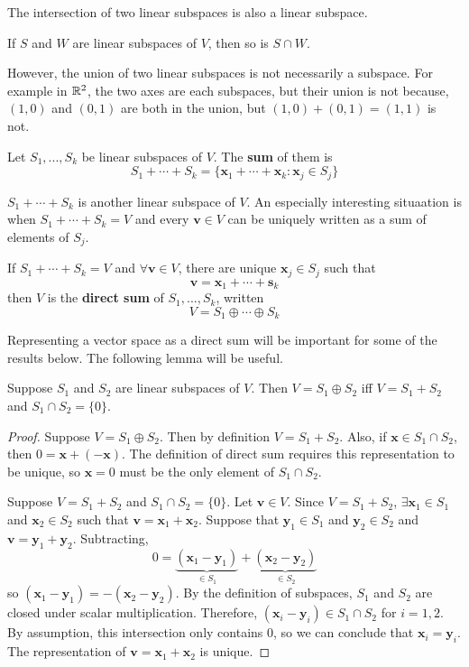 The intersection of two linear subspaces is also a linear subspace.
\begin{example}
  If $S$ and $W$ are linear subspaces of $V$, then so is $S \cap W$.
\end{example}
However, the union of two linear subspaces is not necessarily a
subspace. For example in $\mathbb{R}^2$, the two axes are each subspaces, but
their union is not because, $(1,0)$ and $(0,1)$ are both in the union,
but $(1,0) + (0,1) = (1,1)$ is not. 
\begin{definition}
  Let $S_1, ..., S_k$ be linear subspaces of $V$. The \textbf{sum} of
  them is
  \[ S_1 + \cdots + S_k = \{ \mathbf{x}_1 + \cdots + \mathbf{x}_k :
  \mathbf{x}_j \in S_j \} \]
\end{definition}
$S_1 + \cdots + S_k$ is another linear subspace of $V$. An especially
interesting situaation is when $S_1 + \cdots + S_k = V$ and every
$\mathbf{v} \in V$ can be uniquely written as a sum of elements of
$S_j$. 
\begin{definition}
  If $S_1 + \cdots + S_k = V$ and $\forall \mathbf{v} \in V$, there
  are unique $\mathbf{x}_j \in S_j$ such that 
  \[ \mathbf{v} = \mathbf{x}_1 + \cdots  + \mathbf{s}_k \]
  then $V$ is the \textbf{direct sum} of $S_1, ..., S_k$, written 
  \[ V = S_1 \oplus \cdots \oplus S_k \]
\end{definition}
Representing a vector space as a direct sum will be important for some
of the results below. The following lemma will be useful.
\begin{lemma}\label{lem:dirSum}
  Suppose $S_1$ and $S_2$ are linear subspaces of $V$. Then $V = S_1
  \oplus S_2$ iff $V = S_1 + S_2$ and $S_1 \cap S_2 = \{0\}$. 
\end{lemma}
\begin{proof}
  Suppose $V = S_1 \oplus S_2$. Then by definition $V = S_1 +
  S_2$. Also, if $\mathbf{x} \in S_1 \cap S_2$, then $0 = \mathbf{x} + (-\mathbf{x})$. The
  definition of direct sum requires this representation to be unique,
  so $\mathbf{x} = 0$ must be the only element of $S_1 \cap S_2$.

  Suppose $V = S_1 + S_2$ and $S_1 \cap S_2 = \{0\}$. Let $\mathbf{v} \in
  V$. Since $V = S_1 + S_2$, $\exists \mathbf{x}_1 \in S_1$ and $\mathbf{x}_2 \in S_2$
  such that $\mathbf{v} = \mathbf{x}_1 + \mathbf{x}_2$. Suppose that
  $\mathbf{y}_1 \in S_1$ and $\mathbf{y}_2 \in S_2$ and $\mathbf{v} =
  \mathbf{y}_1 + \mathbf{y}_2$. Subtracting, 
  \[ 0 = \underbrace{(\mathbf{x}_1 - \mathbf{y}_1)}_{\in S_1} + \underbrace{(\mathbf{x}_2 -
    \mathbf{y}_2)}_{\in S_2} \]
  so $(\mathbf{x}_1 - \mathbf{y}_1) = -(\mathbf{x}_2 -
  \mathbf{y}_2)$. By the definition of subspaces, $S_1$ and $S_2$ are
  closed under scalar multiplication. Therefore, $(\mathbf{x}_i -
  \mathbf{y}_i) \in S_1 \cap S_2$ for $i = 1, 2$. By assumption, this
  intersection only contains $0$, so we can conclude that
  $\mathbf{x}_i = \mathbf{y}_i$. The representation of $\mathbf{v} =
  \mathbf{x}_1 + \mathbf{x}_2$ is unique.
\end{proof}

